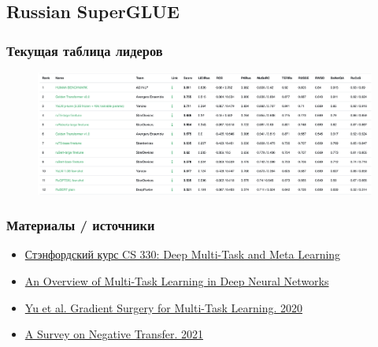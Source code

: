 \documentclass[aspectratio=169]{beamer}
\begin{document}
\subsection{Russian SuperGLUE}

\begin{frame}
	\frametitle{Текущая таблица лидеров}
	\begin{figure}
	    \includegraphics[width=1\textwidth]{assets/rsg_lb.png}
	\end{figure}
\end{frame}

\begin{frame}
	\frametitle{Материалы / источники}
	\begin{itemize}
		\item \href{https://cs330.stanford.edu/}{\color {blue} Стэнфордский курс CS 330: Deep Multi-Task and Meta Learning}
		\item \href{https://ruder.io/multi-task/}{\color {blue} An Overview of Multi-Task Learning in Deep Neural Networks}
		\item \href{https://arxiv.org/abs/2001.06782}{\color {blue} Yu et al. Gradient Surgery for Multi-Task Learning. 2020}
		\item \href{https://arxiv.org/abs/2009.00909}{\color {blue} A Survey on Negative Transfer. 2021}
	\end{itemize}
\end{frame}
\end{document}
